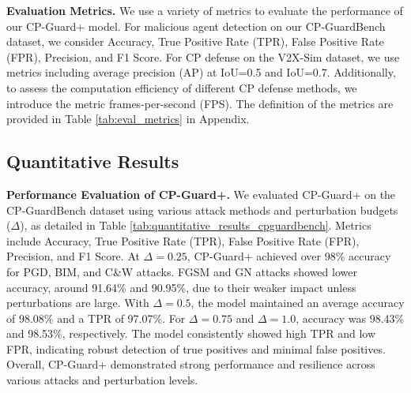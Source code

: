\textbf{Evaluation Metrics.} We use a variety of metrics to evaluate the performance of our CP-Guard+ model. For malicious agent detection on our CP-GuardBench dataset, we consider Accuracy, True Positive Rate (TPR), False Positive Rate (FPR), Precision, and F1 Score. For CP defense on the V2X-Sim dataset, we use metrics including average precision (AP) at IoU=0.5 and IoU=0.7. Additionally, to assess the computation efficiency of different CP defense methods, we introduce the metric frames-per-second (FPS). The definition of the metrics are provided in Table \ref{tab:eval_metrics} in Appendix.









\subsection{Quantitative Results}

\textbf{Performance Evaluation of CP-Guard+.} 
We evaluated CP-Guard+ on the CP-GuardBench dataset using various attack methods and perturbation budgets ($\Delta$), as detailed in Table \ref{tab:quantitative_results_cpguardbench}. Metrics include Accuracy, True Positive Rate (TPR), False Positive Rate (FPR), Precision, and F1 Score. At $\Delta = 0.25$, CP-Guard+ achieved over 98\% accuracy for PGD, BIM, and C\&W attacks. FGSM and GN attacks showed lower accuracy, around 91.64\% and 90.95\%, due to their weaker impact unless perturbations are large. With $\Delta = 0.5$, the model maintained an average accuracy of 98.08\% and a TPR of 97.07\%. For $\Delta = 0.75$ and $\Delta = 1.0$, accuracy was 98.43\% and 98.53\%, respectively. The model consistently showed high TPR and low FPR, indicating robust detection of true positives and minimal false positives. Overall, CP-Guard+ demonstrated strong performance and resilience across various attacks and perturbation levels.

